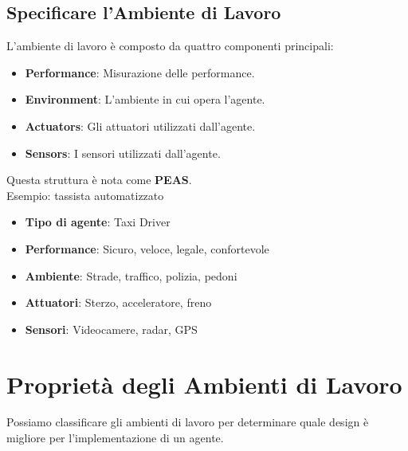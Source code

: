 \subsection{Specificare l'Ambiente di Lavoro}

L'ambiente di lavoro è composto da quattro componenti principali:

\begin{itemize}
	\item \textbf{Performance}: Misurazione delle performance.
	\item \textbf{Environment}: L'ambiente in cui opera l'agente.
	\item \textbf{Actuators}: Gli attuatori utilizzati dall'agente.
	\item \textbf{Sensors}: I sensori utilizzati dall'agente.
\end{itemize}

Questa struttura è nota come \textbf{PEAS}.\\

Esempio: tassista automatizzato

\begin{itemize}
	\item \textbf{Tipo di agente}: Taxi Driver
	\item \textbf{Performance}: Sicuro, veloce, legale, confortevole
	\item \textbf{Ambiente}: Strade, traffico, polizia, pedoni
	\item \textbf{Attuatori}: Sterzo, acceleratore, freno
	\item \textbf{Sensori}: Videocamere, radar, GPS
\end{itemize}

\section{Proprietà degli Ambienti di Lavoro}

Possiamo classificare gli ambienti di lavoro per determinare quale design
è migliore per l'implementazione di un agente.

